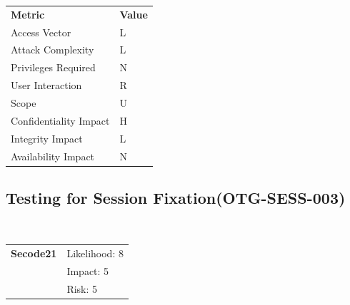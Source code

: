 \documentclass[headsepline,footsepline,footinclude=false,oneside,fontsize=11pt,paper=a4,listof=totoc,bibliography=totoc]{scrbook} %
\begin{document}
\begin{center}
	\begin{tabular}{ll}
		\rowcolor[HTML]{34CDF9}
		{\color[HTML]{ECF4FF} \textbf{Metric}}        & {\color[HTML]{ECF4FF} \textbf{Value}} \\
		\rowcolor[HTML]{BBDAFF}
		{\color[HTML]{333333} Access Vector}          & {\color[HTML]{333333} } L             \\
		\rowcolor[HTML]{ECF4FF}
		{\color[HTML]{333333} Attack Complexity}      & {\color[HTML]{333333} } L              \\
		\rowcolor[HTML]{BBDAFF}
		{\color[HTML]{333333} Privileges Required}    & {\color[HTML]{333333} } N              \\
		\rowcolor[HTML]{ECF4FF}
		{\color[HTML]{333333} User Interaction}       & {\color[HTML]{333333} } R              \\
		\rowcolor[HTML]{BBDAFF}
		{\color[HTML]{333333} Scope}                  & {\color[HTML]{333333} } U              \\
		\rowcolor[HTML]{ECF4FF}
		{\color[HTML]{333333} Confidentiality Impact} & {\color[HTML]{333333} } H              \\
		\rowcolor[HTML]{BBDAFF}
		{\color[HTML]{333333} Integrity Impact}       & {\color[HTML]{333333} } L              \\
		\rowcolor[HTML]{ECF4FF}
		{\color[HTML]{333333} Availability Impact}    & {\color[HTML]{333333} } N
	\end{tabular}
\end{center}

\pagebreak
\subsection{Testing for Session Fixation(OTG-SESS-003)}\

\begin{tabular}{cR{12cm}}
	\textbf{Secode21} & Likelihood: 8\\& Impact: 5\\& Risk: 5
\end{tabular}
\end{document}
